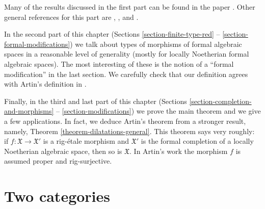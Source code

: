 \medskip\noindent
Many of the results discussed in the first part can be found in the paper
\cite{Elkik}. Other general references for this part are
\cite{EGA}, \cite{Abbes}, and \cite{Fujiwara-Kato}.

\medskip\noindent
In the second part of this chapter
(Sections \ref{section-finite-type-red} -- \ref{section-formal-modifications})
we talk about types of morphisms of formal algebraic spaces
in a reasonable level of generality (mostly for locally Noetherian
formal algebraic spaces). The most interesting of these is
the notion of a ``formal modification'' in the last section.
We carefully check that our definition agrees with
Artin's definition in \cite{ArtinII}.

\medskip\noindent
Finally, in the third and last part of this chapter
(Sections \ref{section-completion-and-morphisms} --
\ref{section-modifications}) we prove the main theorem and
we give a few applications.
In fact, we deduce Artin's theorem from a stronger
result, namely, Theorem \ref{theorem-dilatations-general}.
This theorem says very roughly: if $f : \mathfrak X \to \mathfrak X'$
is a rig-\'etale morphism and $\mathfrak X'$ is the formal
completion of a locally Noetherian algebraic space, then so
is $\mathfrak X$. In Artin's work the morphism $f$ is assumed proper
and rig-surjective.









\section{Two categories}
\label{section-two-categories}

